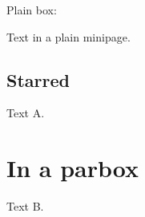 \documentclass{article}
\begin{document}
Plain box: \begin{minipage}[t]{3cm}Text in a plain minipage.\end{minipage}

\begin{minipage}[t]{4cm}
\subsection*{Starred}
Text A.
\end{minipage}

\parbox{5cm}{\section{In a parbox} Text B.}

\end{document}
